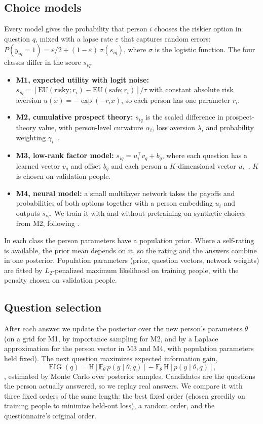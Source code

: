 \documentclass{article}
\newcommand{\EIG}{\operatorname{EIG}}
\begin{document}
\subsection{Choice models}
Every model gives the probability that person $i$ chooses the riskier option in question $q$, mixed with a lapse rate $\varepsilon$ that captures random errors: $P(y_{iq} = 1) = \varepsilon/2 + (1 - \varepsilon)\,\sigma(s_{iq})$, where $\sigma$ is the logistic function. The four classes differ in the score $s_{iq}$.
\begin{itemize}
  \item \textbf{M1, expected utility with logit noise:} $s_{iq} = [\mathrm{EU}(\text{risky}; r_i) - \mathrm{EU}(\text{safe}; r_i)]/\tau$ with constant absolute risk aversion $u(x) = -\exp(-r_i x)$, so each person has one parameter $r_i$.
  \item \textbf{M2, cumulative prospect theory:} $s_{iq}$ is the scaled difference in prospect-theory value, with person-level curvature $\alpha_i$, loss aversion $\lambda_i$ and probability weighting $\gamma_i$~\citep{tversky1992}.
  \item \textbf{M3, low-rank factor model:} $s_{iq} = u_i^\top v_q + b_q$, where each question has a learned vector $v_q$ and offset $b_q$ and each person a $K$-dimensional vector $u_i$~\citep{koren2009}. $K$ is chosen on validation people.
  \item \textbf{M4, neural model:} a small multilayer network takes the payoffs and probabilities of both options together with a person embedding $u_i$ and outputs $s_{iq}$. We train it with and without pretraining on synthetic choices from M2, following \citet{bourgin2019}.
\end{itemize}
In each class the person parameters have a population prior. Where a self-rating is available, the prior mean depends on it, so the rating and the answers combine in one posterior. Population parameters (prior, question vectors, network weights) are fitted by $L_2$-penalized maximum likelihood on training people, with the penalty chosen on validation people.

\subsection{Question selection}
After each answer we update the posterior over the new person's parameters $\theta$ (on a grid for M1, by importance sampling for M2, and by a Laplace approximation for the person vector in M3 and M4, with population parameters held fixed). The next question maximizes expected information gain,
\begin{equation}
  \EIG(q) = \mathrm{H}\!\left[\mathbb{E}_{\theta}\, p(y \mid \theta, q)\right] - \mathbb{E}_{\theta}\, \mathrm{H}\!\left[p(y \mid \theta, q)\right],
\end{equation}
\citep{houlsby2011}, estimated by Monte Carlo over posterior samples. Candidates are the questions the person actually answered, so we replay real answers. We compare it with three fixed orders of the same length: the best fixed order (chosen greedily on training people to minimize held-out loss), a random order, and the questionnaire's original order.
\end{document}

